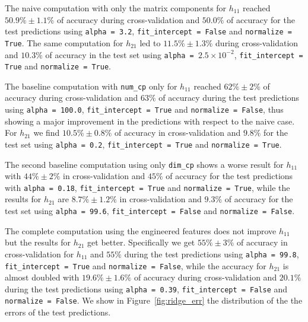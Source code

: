     The naive computation with only the matrix components for $h_{11}$ reached $50.9\% \pm 1.1\%$ of accuracy during cross-validation and $50.0\%$ of accuracy for the test predictions using \texttt{alpha = 3.2}, \texttt{fit\_intercept = False} and \texttt{normalize = True}. The same computation for $h_{21}$ led to $11.5\% \pm 1.3\%$ during cross-validation and $10.3\%$ of accuracy in the test set using \texttt{alpha = $2.5 \times 10^{-2}$}, \texttt{fit\_intercept = True} and \texttt{normalize = True}.
    
    The baseline computation with \texttt{num\_cp} only for $h_{11}$ reached $62\% \pm 2\%$ of accuracy during cross-validation and $63\%$ of accuracy during the test predictions using \texttt{alpha = 100.0}, \texttt{fit\_intercept = True} and \texttt{normalize = False}, thus showing a major improvement in the predictions with respect to the naive case. For $h_{21}$ we find $10.5\% \pm 0.8\%$ of accuracy in cross-validation and $9.8\%$ for the test set using \texttt{alpha = 0.2}, \texttt{fit\_intercept = True} and \texttt{normalize = True}.
    
    The second baseline computation using only \texttt{dim\_cp} shows a worse result for $h_{11}$ with $44\% \pm 2\%$ in cross-validation and $45\%$ of accuracy for the test predictions with \texttt{alpha = 0.18}, \texttt{fit\_intercept = True} and \texttt{normalize = True}, while the results for $h_{21}$ are $8.7\% \pm 1.2\%$ in cross-validation and $9.3\%$ of accuracy for the test set using \texttt{alpha = 99.6}, \texttt{fit\_intercept = False} and \texttt{normalize = False}.
    
    The complete computation using the engineered features does not improve $h_{11}$ but the results for $h_{21}$ get better. Specifically we get $55\% \pm 3\%$ of accuracy in cross-validation for $h_{11}$ and $55\%$ during the test predictions using \texttt{alpha = 99.8}, \texttt{fit\_intercept = True} and \texttt{normalize = False}, while the accuracy for $h_{21}$ is almost doubled with $19.6\% \pm 1.6\%$ of accuracy during cross-validation and $20.1\%$ during the test predictions using \texttt{alpha = 0.39}, \texttt{fit\_intercept = False} and \texttt{normalize = False}. We show in Figure~\ref{fig:ridge_err} the distribution of the the errors of the test predictions.
    
